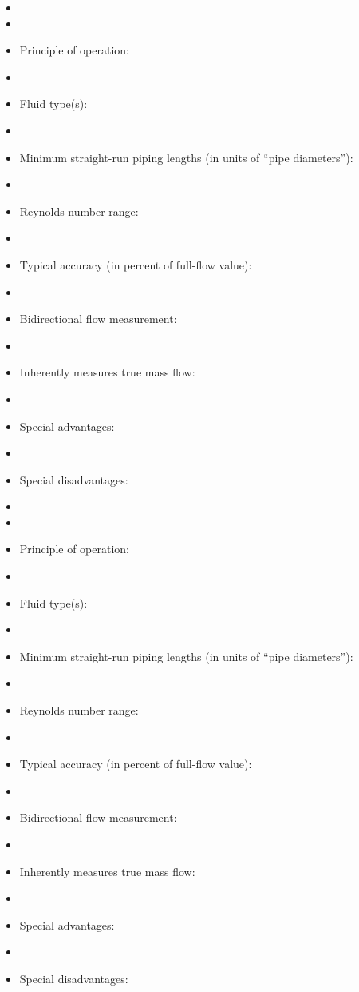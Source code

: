 \documentclass[12pt,a4paper]{article}
\begin{document}
\begin{itemize}
\goodbreak
\item{} 
\vskip 5pt
\item\item{} Principle of operation:
\vskip 5pt
\item\item{} Fluid type(s):
\vskip 5pt
\item\item{} Minimum straight-run piping lengths (in units of ``pipe diameters''):
\vskip 5pt
\item\item{} Reynolds number range:
\vskip 5pt
\item\item{} Typical accuracy (in percent of full-flow value):
\vskip 5pt
\item\item{} Bidirectional flow measurement:
\vskip 5pt
\item\item{} Inherently measures true mass flow:
\vskip 5pt
\item\item{} Special advantages:
\vskip 5pt
\item\item{} Special disadvantages: 
\end{itemize}

\begin{itemize}
\goodbreak
\item{} 
\vskip 5pt
\item\item{} Principle of operation:
\vskip 5pt
\item\item{} Fluid type(s):
\vskip 5pt
\item\item{} Minimum straight-run piping lengths (in units of ``pipe diameters''):
\vskip 5pt
\item\item{} Reynolds number range:
\vskip 5pt
\item\item{} Typical accuracy (in percent of full-flow value):
\vskip 5pt
\item\item{} Bidirectional flow measurement:
\vskip 5pt
\item\item{} Inherently measures true mass flow:
\vskip 5pt
\item\item{} Special advantages:
\vskip 5pt
\item\item{} Special disadvantages:
\end{itemize}
\end{document}
